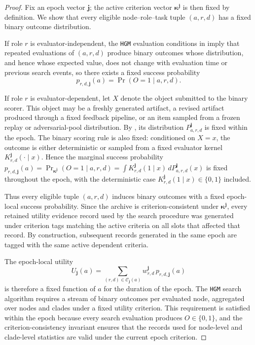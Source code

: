 \documentclass{paper}
\newcommand{\hgm}{\texttt{HGM}\xspace}
\begin{document}
\begin{proof}
Fix an epoch vector \(\boldsymbol{j}\); the active criterion vector
\(\boldsymbol{\kappa}^{\boldsymbol{j}}\) is then fixed by definition. We show that every eligible
node--role--task tuple \((a,r,d)\) has a fixed binary outcome distribution.

If role \(r\) is evaluator-independent, the \hgm evaluation conditions in
 imply that repeated evaluations of \((a,r,d)\) produce binary outcomes whose
distribution, and hence whose expected value, does not change with evaluation time or previous
search events, so there exists a fixed success probability
\[
p_{r,d,\boldsymbol{j}}(a)=\Pr(O=1\mid a,r,d).
\]

If role \(r\) is evaluator-dependent, let \(X\) denote the object submitted to the binary scorer. This
object may be a freshly generated artifact, a revised artifact produced through a fixed feedback
pipeline, or an item sampled from a frozen replay or adversarial-pool distribution. By
, its distribution \(P_{a,r,d}^{\boldsymbol{j}}\) is fixed within the epoch. The
binary scoring rule is also fixed: conditioned on \(X=x\), the outcome is either deterministic or
sampled from a fixed evaluator kernel \(K_{r,d}^{\boldsymbol{j}}(\cdot\mid x)\). Hence the marginal
success probability \(p_{r,d,\boldsymbol{j}}(a)=\Pr_{\boldsymbol{\kappa}^{\boldsymbol{j}}}(O=1\mid a,r,d)=\int K_{r,d}^{\boldsymbol{j}}(1\mid x)\,dP_{a,r,d}^{\boldsymbol{j}}(x)\) is fixed throughout the epoch, with the deterministic case \(K_{r,d}^{\boldsymbol{j}}(1\mid x)\in\{0,1\}\) included.

Thus every eligible tuple \((a,r,d)\) induces binary outcomes with a fixed epoch-local success
probability. Since the archive is criterion-consistent under
\(\boldsymbol{\kappa}^{\boldsymbol{j}}\), every retained utility evidence record used by the search
procedure was generated under criterion tags matching the active criteria on all slots that affected
that record. By construction, subsequent records generated in the same epoch are tagged
with the same active dependent criteria.

The epoch-local utility
\[
U_{\boldsymbol{j}}(a)
=
\sum_{(r,d)\in\mathcal C_{\boldsymbol{j}}(a)}
w_{r,d}^{\boldsymbol{j}}\,p_{r,d,\boldsymbol{j}}(a)
\]
is therefore a fixed function of \(a\) for the duration of the epoch. The \hgm search
algorithm requires a stream of binary outcomes per evaluated node, aggregated over nodes and
clades under a fixed utility criterion. This requirement is satisfied within the epoch because every
search evaluation produces \(O\in\{0,1\}\), and the criterion-consistency invariant ensures that the
records used for node-level and clade-level statistics are valid under the current epoch criterion.


\end{proof}
\end{document}
